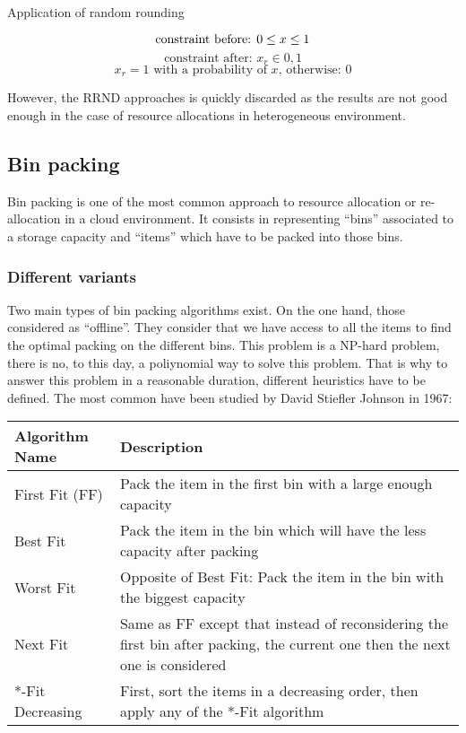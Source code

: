 \documentclass[a4paper,11pt]{article}
\begin{document}
\begin{figequation}
	\caption{Application of random rounding}
	\[
		\text{constraint before: } 0 \leq x \leq 1 \\
	\]
	\[
		\text{constraint after: } x_r \in {0, 1}
	\]
	\[
		x_r = 1 \text{ with a probability of $x$, otherwise: $0$}
	\]
\end{figequation}

However, the RRND approaches is quickly discarded as the results are not good
enough in the case of resource allocations in heterogeneous environment.

\subsection{Bin packing}

Bin packing is one of the most common approach to resource allocation or
re-allocation in a cloud environment. It consists in representing “bins”
associated to a storage capacity and “items” which have to be packed into
those bins.

\subsubsection{Different variants}

Two main types of bin packing algorithms exist. On the one hand, those
considered as “offline”. They consider that we have access to all the items to
find the optimal packing on the different bins. This problem is a NP-hard
problem, there is no, to this day, a poliynomial way to solve this problem.
That is why to answer this problem in a reasonable duration, different
heuristics have to be defined. The most common have been studied by David
Stiefler Johnson in 1967\cite{maths:bpheuristics}:

\vspace{1em}
\begin{center}
	\begin{tabular}{| l | p{7cm} |}
		\hline
		Algorithm Name & Description \\
		\hline
		First Fit (FF) & Pack the item in the first bin with a large enough capacity \\
		\hline
		Best Fit & Pack the item in the bin which will have the less capacity after packing \\
		\hline
		Worst Fit & Opposite of Best Fit: Pack the item in the bin with the biggest capacity \\
		\hline
		Next Fit & Same as FF except that instead of reconsidering the first bin after packing, the current one then the next one is considered \\
		\hline
		*-Fit Decreasing & First, sort the items in a decreasing order, then apply any of the *-Fit algorithm \\
		\hline
	\end{tabular}
\end{center}
\vspace{1em}
\end{document}
